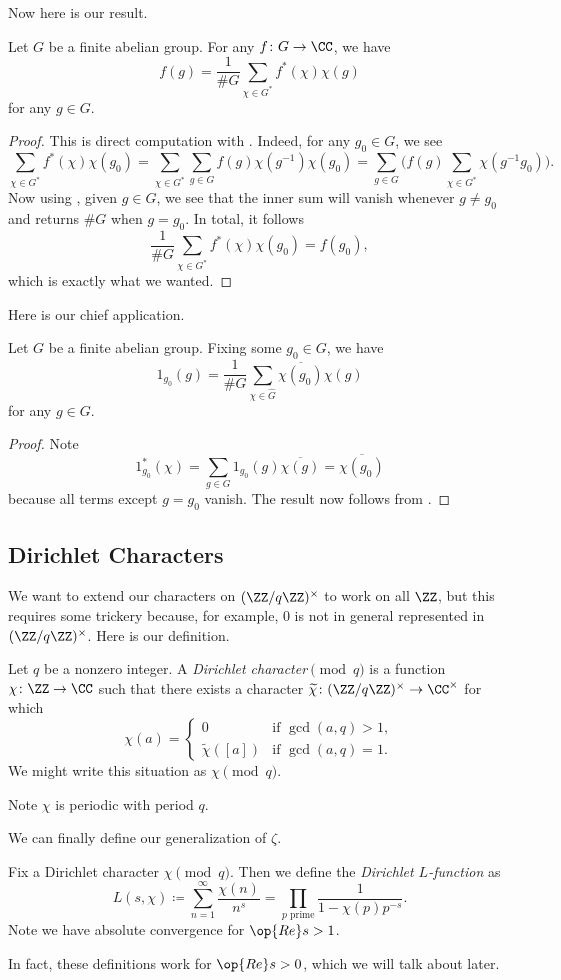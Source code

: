\documentclass[../notes.tex]{subfiles}
\begin{document}
Now here is our result.
\begin{theorem} \label{thm:fourier-inversion}
	Let $G$ be a finite abelian group. For any $f\colon G\to\CC$, we have
	\[f(g)=\frac1{\#G}\sum_{\chi\in G^*}f^*(\chi)\chi(g)\]
	for any $g\in G$.
\end{theorem}
\begin{proof}
	This is direct computation with . Indeed, for any $g_0\in G$, we see
	\[\sum_{\chi\in G^*}f^*(\chi)\chi(g_0) = \sum_{\chi\in G^*}\sum_{g\in G}f(g)\chi\left(g^{-1}\right)\chi(g_0) = \sum_{g\in G}\Bigg(f(g)\sum_{\chi\in G^*}\chi\left(g^{-1}g_0\right)\Bigg).\]
	Now using , given $g\in G$, we see that the inner sum will vanish whenever $g\ne g_0$ and returns $\#G$ when $g=g_0$. In total, it follows
	\[\frac1{\#G}\sum_{\chi\in G^*}f^*(\chi)\chi(g_0)=f(g_0),\]
	which is exactly what we wanted.
\end{proof}
Here is our chief application.
\begin{corollary}
	Let $G$ be a finite abelian group. Fixing some $g_0\in G$, we have
	\[1_{g_0}(g)=\frac1{\#G}\sum_{\chi\in\widehat G}\overline{\chi(g_0)}\chi(g)\]
	for any $g\in G$.
\end{corollary}
\begin{proof}
	Note
	\[1_{g_0}^*(\chi)=\sum_{g\in G}1_{g_0}(g)\overline{\chi(g)}=\overline{\chi(g_0)}\]
	because all terms except $g=g_0$ vanish. The result now follows from .
\end{proof}

\subsection{Dirichlet Characters}
We want to extend our characters on $(\ZZ/q\ZZ)^\times$ to work on all $\ZZ$, but this requires some trickery because, for example, $0$ is not in general represented in $(\ZZ/q\ZZ)^\times$. Here is our definition.
\begin{definition}
	Let $q$ be a nonzero integer. A \textit{Dirichlet character$\pmod q$} is a function $\chi\colon\ZZ\to\CC$ such that there exists a character $\widetilde\chi\colon(\ZZ/q\ZZ)^\times\to\CC^\times$ for which
	\[\chi(a)=\begin{cases}
		0 & \text{if }\gcd(a,q)>1, \\
		\widetilde\chi([a]) & \text{if }\gcd(a,q)=1.
	\end{cases}\]
	We might write this situation as $\chi\pmod q$.
\end{definition}
\begin{remark}
	Note $\chi$ is periodic with period $q$.
\end{remark}
We can finally define our generalization of $\zeta$.
\begin{definition}
	Fix a Dirichlet character $\chi\pmod q$. Then we define the \textit{Dirichlet $L$-function} as
	\[L(s,\chi)\coloneqq\sum_{n=1}^\infty\frac{\chi(n)}{n^s}=\prod_{p\text{ prime}}\frac1{1-\chi(p)p^{-s}}.\]
	Note we have absolute convergence for $\op{Re}s>1$.
\end{definition}
In fact, these definitions work for $\op{Re}s>0$, which we will talk about later.
\end{document}
